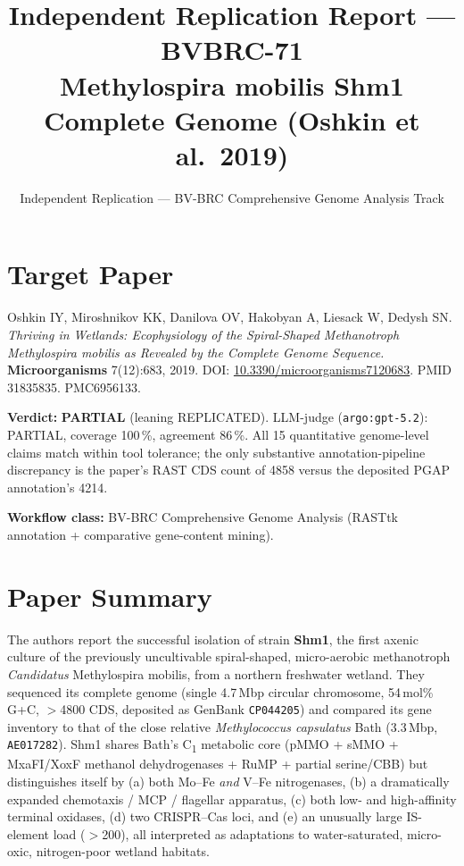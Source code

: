 \documentclass[11pt]{article}
\title{Independent Replication Report --- BVBRC-71\\
\large Methylospira mobilis Shm1 Complete Genome (Oshkin et al.\ 2019)}
\author{Independent Replication --- BV-BRC Comprehensive Genome Analysis Track}
\date{}
\begin{document}
\maketitle

\section*{Target Paper}
Oshkin IY, Miroshnikov KK, Danilova OV, Hakobyan A, Liesack W, Dedysh SN.
\emph{Thriving in Wetlands: Ecophysiology of the Spiral-Shaped Methanotroph
Methylospira mobilis as Revealed by the Complete Genome Sequence.}
\textbf{Microorganisms} 7(12):683, 2019.
DOI: \href{https://doi.org/10.3390/microorganisms7120683}{10.3390/microorganisms7120683}.
PMID 31835835. PMC6956133.

\textbf{Verdict:} \textbf{PARTIAL} (leaning REPLICATED). LLM-judge (\texttt{argo:gpt-5.2}):
PARTIAL, coverage 100\,\%, agreement 86\,\%. All 15 quantitative
genome-level claims match within tool tolerance; the only substantive
annotation-pipeline discrepancy is the paper's RAST CDS count of 4858
versus the deposited PGAP annotation's 4214.

\textbf{Workflow class:} BV-BRC Comprehensive Genome Analysis
(RASTtk annotation + comparative gene-content mining).

\section{Paper Summary}
The authors report the successful isolation of strain \textbf{Shm1}, the first axenic
culture of the previously uncultivable spiral-shaped, micro-aerobic methanotroph
\emph{Candidatus} Methylospira mobilis, from a northern freshwater wetland. They
sequenced its complete genome (single 4.7\,Mbp circular chromosome, 54\,mol\% G+C,
$>$4800 CDS, deposited as GenBank \texttt{CP044205}) and compared its gene
inventory to that of the close relative \emph{Methylococcus capsulatus} Bath
(3.3\,Mbp, \texttt{AE017282}). Shm1 shares Bath's C\textsubscript{1} metabolic
core (pMMO + sMMO + MxaFI/XoxF methanol dehydrogenases + RuMP + partial
serine/CBB) but distinguishes itself by (a) both Mo--Fe \emph{and} V--Fe
nitrogenases, (b) a dramatically expanded chemotaxis / MCP / flagellar
apparatus, (c) both low- and high-affinity terminal oxidases, (d) two
CRISPR--Cas loci, and (e) an unusually large IS-element load ($>$200), all
interpreted as adaptations to water-saturated, micro-oxic, nitrogen-poor
wetland habitats.
\end{document}
